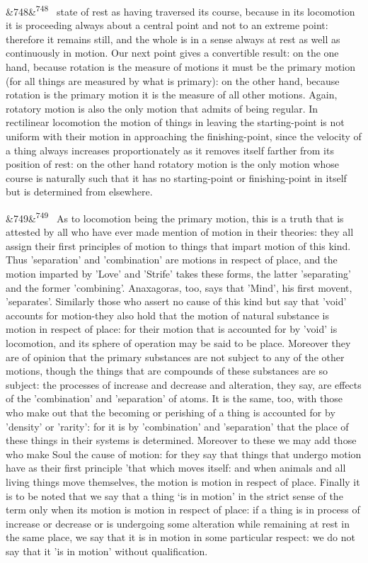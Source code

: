 \documentclass[12pt]{article}
\newcommand{\para}[1][]{\par\noindent\ifx&#1&\else\textsuperscript{\footnotesize #1}~\fi}
\begin{document}
\para[748] state of rest as having traversed its course, because in its locomotion it is proceeding always about a central point and not to an extreme point: therefore it remains still, and the whole is in a sense always at rest as well as continuously in motion. Our next point gives a convertible result: on the one hand, because rotation is the measure of motions it must be the primary motion (for all things are measured by what is primary): on the other hand, because rotation is the primary motion it is the measure of all other motions. Again, rotatory motion is also the only motion that admits of being regular. In rectilinear locomotion the motion of things in leaving the starting-point is not uniform with their motion in approaching the finishing-point, since the velocity of a thing always increases proportionately as it removes itself farther from its position of rest: on the other hand rotatory motion is the only motion whose course is naturally such that it has no starting-point or finishing-point in itself but is determined from elsewhere.

\para[749] As to locomotion being the primary motion, this is a truth that is attested by all who have ever made mention of motion in their theories: they all assign their first principles of motion to things that impart motion of this kind. Thus 'separation' and 'combination' are motions in respect of place, and the motion imparted by 'Love' and 'Strife' takes these forms, the latter 'separating' and the former 'combining’. Anaxagoras, too, says that 'Mind', his first movent, 'separates'. Similarly those who assert no cause of this kind but say that 'void' accounts for motion-they also hold that the motion of natural substance is motion in respect of place: for their motion that is accounted for by 'void' is locomotion, and its sphere of operation may be said to be place. Moreover they are of opinion that the primary substances are not subject to any of the other motions, though the things that are compounds of these substances are so subject: the processes of increase and decrease and alteration, they say, are effects of the 'combination' and 'separation' of atoms. It is the same, too, with those who make out that the becoming or perishing of a thing is accounted for by 'density' or 'rarity': for it is by 'combination' and 'separation' that the place of these things in their systems is determined. Moreover to these we may add those who make Soul the cause of motion: for they say that things that undergo motion have as their first principle 'that which moves itself: and when animals and all living things move themselves, the motion is motion in respect of place. Finally it is to be noted that we say that a thing ‘is in motion' in the strict sense of the term only when its motion is motion in respect of place: if a thing is in process of increase or decrease or is undergoing some alteration while remaining at rest in the same place, we say that it is in motion in some particular respect: we do not say that it 'is in motion' without qualification.
\end{document}

